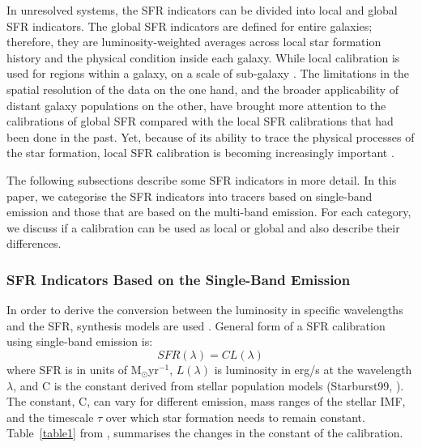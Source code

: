 In unresolved systems, the SFR indicators can be divided into local and global SFR indicators. The global SFR indicators are defined for entire galaxies; therefore, they are luminosity-weighted averages across local star formation history and the physical condition inside each galaxy. While local calibration is used for regions within a galaxy, on a scale of sub-galaxy \citep[e.g.,][]{Zhu08, Kennicutt09, Boquien10, Boquien11, Hao11}. The limitations in the spatial resolution of the data on the one hand, and the broader applicability of distant galaxy populations on the other, have brought more attention to the calibrations of global SFR compared with the local SFR calibrations that had been done in the past. Yet, because of its ability to trace the physical processes of the star formation, local SFR calibration is becoming increasingly important \cite{Calzetti13}.

The following subsections describe some SFR indicators in more detail. In this paper, we categorise the SFR indicators into tracers based on single-band emission and those that are based on the multi-band emission. For each category, we discuss if a calibration can be used as local or global and also describe their differences.  

\subsubsection*{SFR Indicators Based on the Single-Band Emission}

In order to derive the conversion between the luminosity in specific wavelengths and the SFR, synthesis models are used \citep{Kennicutt98b}. General form of a SFR calibration using single-band emission is: 
\begin{equation}
\label{equ: sfrsingle}
SFR(\lambda)= CL(\lambda)
\end{equation}
where SFR is in units of M${_\odot}$yr$^{-1}$, $L(\lambda)$ is luminosity in erg/s at the wavelength $\lambda$, and C is the constant derived from stellar population models (Starburst99, \cite{Leitherer99}). The constant, C, can vary for different emission, mass ranges of the stellar IMF, and the timescale $\tau$ over which star formation needs to remain constant. Table~\ref{table1} from \cite{Calzetti13}, summarises the changes in the constant of the calibration. 

